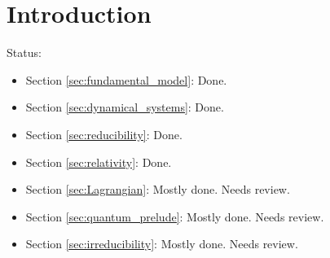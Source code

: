 \documentclass[smallextended]{svjour3}
\numberwithin{equation}{section}
\begin{document}
\section{Introduction}

Status:
\begin{itemize}
\item Section \ref{sec:fundamental_model}: Done.

\item Section \ref{sec:dynamical_systems}: Done.

\item Section \ref{sec:reducibility}: Done.

\item Section \ref{sec:relativity}: Done.

\item Section \ref{sec:Lagrangian}: Mostly done. Needs review.

\item Section \ref{sec:quantum_prelude}: Mostly done. Needs review.

\item Section \ref{sec:irreducibility}: Mostly done. Needs review.
\end{itemize}


\end{document}
